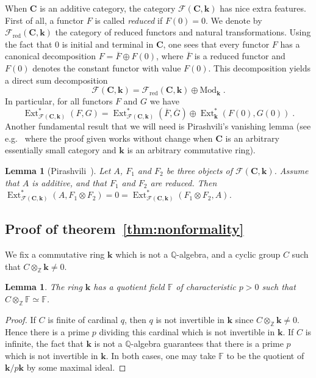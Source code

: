 \documentclass{amsart}
\newtheorem{lemma}[formula]{Lemma}
\theoremstyle{definition}
\theoremstyle{remark}
\newcommand{\Z}{\mathbb Z}
\newcommand{\Q}{\mathbb Q}
\newcommand{\F}{\mathbb F}
\DeclareMathOperator{\Ext}{Ext}
\newcommand{\Cc}{\mathbf{C}}
\def\k{\mathbf{k}}
\begin{document}
When $\Cc$ is an additive category, the category $\mathcal{F}(\Cc,\k)$ has nice extra features. First of all, a functor $F$ is called \emph{reduced} if $F(0)=0$. We denote by $\mathcal{F}_{\mathrm{red}}(\Cc,\k)$ the category of reduced functors and natural transformations. Using the fact that $0$ is initial and terminal in $\Cc$, one sees that every functor $F$ has a canonical decomposition $F=\overline{F}\oplus F(0)$, where $\overline{F}$ is a reduced functor and $F(0)$ denotes the constant functor with value $F(0)$. This decomposition yields a direct sum decomposition 
\[
	\mathcal{F}(\Cc,\k)=\mathcal{F}_{\mathrm{red}}(\Cc,\k)\oplus \mathrm{Mod}_\k\;.
\] 
In particular, for all functors $F$ and $G$ we have
\[
	\Ext^*_{\mathcal{F}(\Cc,\k)}(F,G)=\Ext^*_{\mathcal{F}(\Cc,\k)}(\overline{F},\overline{G})\oplus \Ext^*_\k(F(0),G(0))\;.
\]
Another fundamental result that we will need is Pirashvili's vanishing lemma (see e.g.~\cite[\S2.4]{pi-03} where the proof given works without change when $\Cc$ is an arbitrary essentially small category and $\k$ is an arbitrary commutative ring).
\begin{lemma}[{Pirashvili~\cite{pi-03}}]\label{lm:pira}
	Let $A$, $F_1$ and $F_2$ be three objects of $\mathcal{F}(\Cc,\k)$. Assume that $A$ is additive, and that $F_1$ and $F_2$ are reduced. Then
	$\Ext^*_{\mathcal{F}(\Cc,\k)}(A,F_1\otimes F_2)=0=\Ext^*_{\mathcal{F}(\Cc,\k)}(F_1\otimes F_2,A)$.
\end{lemma}

\subsection{Proof of theorem~\ref{thm:nonformality}}
We fix a commutative ring $\k$ which is not a $\Q$-algebra, and a cyclic group $C$ such that $C\otimes_{\mathbb{Z}}\k\ne 0$. 
\begin{lemma}\label{lm:field}
	The ring $\k$ has a quotient field $\F$ of characteristic $p>0$ such that $C\otimes_{\Z}\F\simeq \F$.
\end{lemma}
\begin{proof}
	If $C$ is finite of cardinal $q$, then $q$ is not invertible in $\k$ since $C\otimes_{\Z}\k\ne 0$. Hence there is a prime $p$ dividing this cardinal which is not invertible in $\k$. If $C$ is infinite, the fact that $\k$ is not a $\Q$-algebra guarantees that there is a prime $p$ which is not invertible in $\k$. In both cases, one may take $\F$ to be the quotient of $\k/p\k$ by some maximal ideal. 
\end{proof}
\end{document}
